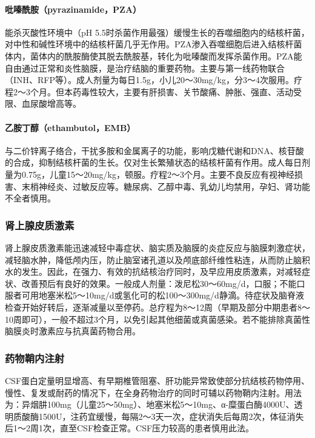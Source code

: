 \paragraph{吡嗪酰胺（pyrazinamide，PZA）}

能杀灭酸性环境中（pH
5.5时杀菌作用最强）缓慢生长的吞噬细胞内的结核杆菌，对中性和碱性环境中的结核杆菌几乎无作用。PZA渗入吞噬细胞后进入结核杆菌体内，菌体内的酰胺酶使其脱去酰胺基，转化为吡嗪酸而发挥杀菌作用。PZA能自由通过正常和炎性脑膜，是治疗结脑的重要药物。主要与第一线药物联合（INH、RFP等）。成人剂量为每日1.5g，小儿20～30mg/kg，分3～4次服用。疗程2～3个月。但本药毒性较大，主要有肝损害、关节酸痛、肿胀、强直、活动受限、血尿酸增高等。

\paragraph{乙胺丁醇（ethambutol，EMB）}

与二价锌离子络合，干扰多胺和金属离子的功能，影响戊糖代谢和DNA、核苷酸的合成，抑制结核杆菌的生长。仅对生长繁殖状态的结核杆菌有作用。成人每日剂量为0.75g，儿童15～20mg/kg，顿服。疗程2～3个月。主要不良反应有视神经损害、末梢神经炎、过敏反应等。糖尿病、乙醇中毒、乳幼儿均禁用，孕妇、肾功能不全者慎用。

\subsubsection{肾上腺皮质激素}

肾上腺皮质激素能迅速减轻中毒症状、脑实质及脑膜的炎症反应与脑膜刺激症状，减轻脑水肿，降低颅内压，防止脑室诸孔道以及颅底部纤维性粘连，从而防止脑积水的发生。因此，在强力、有效的抗结核治疗同时，及早应用皮质激素，对减轻症状、改善预后有良好的效果。一般成人剂量：泼尼松30～60mg/d，口服；不能口服者可用地塞米松5～10mg/d或氢化可的松100～300mg/d静滴。待症状及脑脊液检查开始好转后，逐渐减量以至停药。总疗程为8～12周（早期及部分中期患者8～10周即可），一般不超过3个月，以免引起其他细菌或真菌感染。若不能排除真菌性脑膜炎时激素应与抗真菌药物合用。

\subsubsection{药物鞘内注射}

CSF蛋白定量明显增高、有早期椎管阻塞、肝功能异常致使部分抗结核药物停用、慢性、复发或耐药的情况下，在全身药物治疗的同时可辅以药物鞘内注射。用法为：异烟肼100mg（儿童25～50mg）、地塞米松5～10mg、α-糜蛋白酶4000U、透明质酸酶1500U，注药宜缓慢，每隔2～3天一次，症状消失后每周2次，体征消失后1～2周1次，直至CSF检查正常。CSF压力较高的患者慎用此法。

